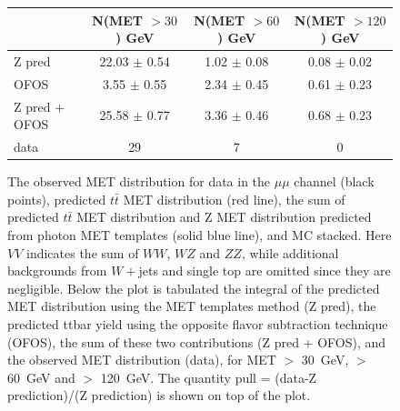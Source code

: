 \begin{figure}[hbtp]
  \begin{center}

	\medskip 

    \begin{tabular}{lccc}
\hline
                        &   N(MET $>30$)  GeV    &   N(MET $>60$)  GeV    &   N(MET $>120$) GeV   \\
\hline
              Z pred    &  22.03  $\pm$  0.54    &   1.02  $\pm$  0.08    &   0.08  $\pm$  0.02   \\
                OFOS    &   3.55  $\pm$  0.55    &   2.34  $\pm$  0.45    &   0.61  $\pm$  0.23   \\
\hline
       Z pred + OFOS    &  25.58  $\pm$  0.77    &   3.36  $\pm$  0.46    &   0.68  $\pm$  0.23   \\
\hline
                data    &                  29    &                   7    &                   0   \\
\hline
    \end{tabular}

    \caption{
      The observed MET distribution for data in the $\mu\mu$ channel (black points),
      predicted $t\bar{t}$ MET distribution (red line), the sum of predicted $t\bar{t}$ MET distribution and
      Z  MET  distribution  predicted  from photon  MET  templates
      (solid blue line),  and MC stacked. Here $VV$  indicates the sum
      of  $WW$,  $WZ$  and  $ZZ$, while  additional  backgrounds  from
      $W+$jets   and   single  top   are   omitted   since  they   are
      negligible.  Below the  plot is  tabulated the  integral  of the
      predicted  MET distribution  using the  MET templates  method (Z
      pred),  the  predicted ttbar  yield  using  the opposite  flavor
      subtraction  technique (OFOS), the  sum of  these two
      contributions (Z pred + OFOS), and the observed MET distribution
      (data), for  MET $>$ 30~GeV,  $>$ 60~GeV and $>$  120~GeV. The
      quantity pull  = (data-Z prediction)/(Z prediction)  is shown on
      top  of the  plot.  
    }
    \label{fig:pfmet_mm}
  \end{center}
\end{figure}


